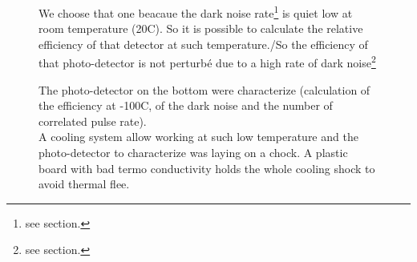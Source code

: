 \begin{figure}[!hbtp]
  We choose that one beacaue the dark noise rate\footnote{see section.} is quiet low at room temperature (20C). So it is possible 
  to calculate the relative efficiency of that detector at such temperature./So the efficiency of that photo-detector is not perturbé
  due to a high rate of dark noise\footnote{see section.}
  
  The photo-detector on the bottom were characterize (calculation of the efficiency at -100C, of the dark noise and the number of 
  correlated pulse rate).\\
  A cooling system allow working at such low temperature and the photo-detector to characterize was laying on a chock. A plastic board 
  with bad termo conductivity holds the whole cooling shock to avoid thermal flee.\\
    

\end{figure}
